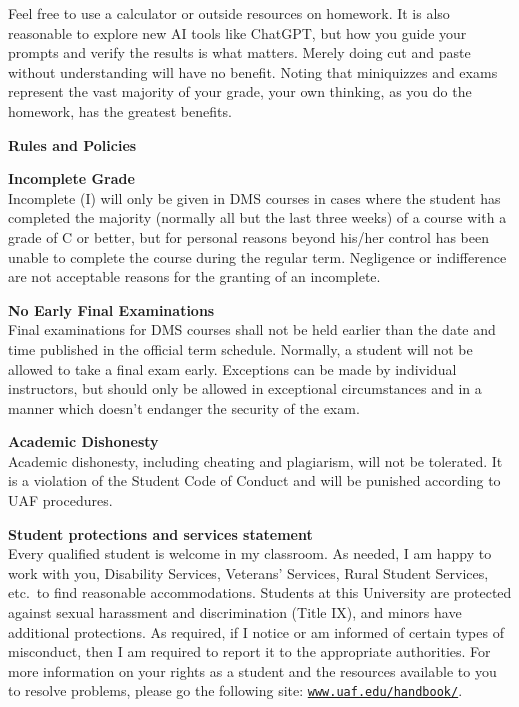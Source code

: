 \documentclass[11pt]{article}
\renewcommand{\emph}[1]{\textsf{\textbf{#1}}}
\newcommand{\localhead}[1]{\par\smallskip\textbf{#1} \smallskip\nobreak\\}%
\def\heading#1{\localhead{\large\emph{#1}}}
\def\subheading#1{\localhead{\emph{#1}}}
\begin{document}
Feel free to use a calculator or outside resources on homework.  It is also reasonable to explore new AI tools like ChatGPT, but how you guide your prompts and verify the results is what matters.  Merely doing cut and paste without understanding will have no benefit.  Noting that miniquizzes and exams represent the vast majority of your grade, your own thinking, as you do the homework, has the greatest benefits.


\heading{Rules and Policies}
\vskip -20pt

\subheading{Incomplete Grade} 
Incomplete (I) will only be given in
  DMS courses in cases where
  the student has completed the majority (normally all but the last
  three weeks) of a course with a grade of C or better, but for
  personal reasons beyond his/her control has been unable to complete
  the course during the regular term. Negligence or indifference are
  not acceptable reasons for the granting of an incomplete. 


\subheading{No Early Final Examinations}
Final examinations for DMS
  courses shall not be held earlier than the date and time published
  in the official term schedule. Normally, a student will not be
  allowed to take a final exam early. Exceptions can be made by
  individual instructors, but should only be allowed in exceptional
  circumstances and in a manner which doesn't endanger the security of
  the exam.

\subheading{Academic Dishonesty}
Academic dishonesty, including cheating and plagiarism, will not
be tolerated.  It is a violation of the Student Code of Conduct
and will be punished according to UAF procedures.

\subheading{Student protections and services statement}
Every qualified student is welcome in my classroom.  As needed, I am happy to work with you, Disability Services, Veterans' Services, Rural Student Services, etc.~to find reasonable accommodations.  Students at this University are protected against sexual harassment and discrimination (Title IX), and minors have additional protections.  As required, if I notice or am informed of certain types of misconduct, then I am required to report it to the appropriate authorities.  For more information on your rights as a student and the resources available to you to resolve problems, please go the following site: \href{https://www.uaf.edu/handbook/}{\texttt{www.uaf.edu/handbook/}}.
\end{document}
